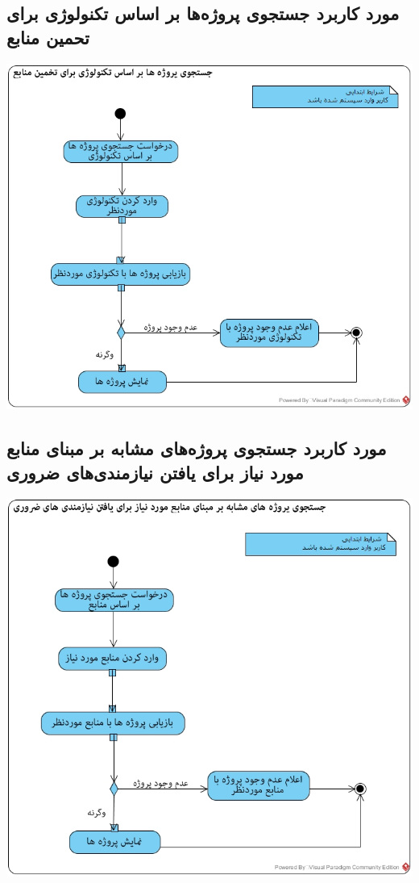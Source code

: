 \documentclass{article}
\begin{document}
\newpage
\vspace{2cm}
\subsection*{مورد کاربرد جستجوی پروژه‌ها بر اساس تکنولوژی برای تحمین منابع}
\vspace{2cm}
\begin{center}
\includegraphics[width=\textwidth]{ActivityDiagrams/46.jpg}
\end{center}

\newpage
\vspace{2cm}
\subsection*{مورد کاربرد جستجوی پروژه‌های مشابه بر مبنای منابع مورد نیاز برای یافتن نیازمندی‌های ضروری}
\vspace{2cm}
\begin{center}
\includegraphics[width=\textwidth]{ActivityDiagrams/47.jpg}
\end{center}
\end{document}
